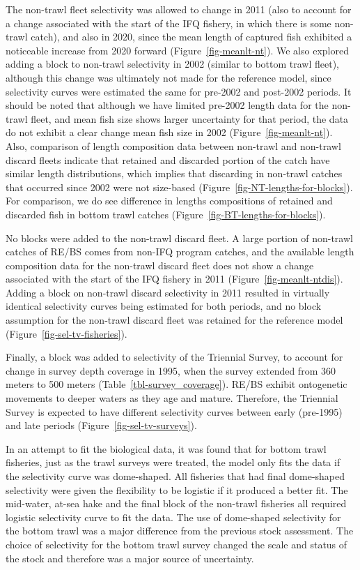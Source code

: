 \documentclass[
]{scrartcl}
\begin{document}
The non-trawl fleet selectivity was allowed to change in 2011 (also to
account for a change associated with the start of the IFQ fishery, in
which there is some non-trawl catch), and also in 2020, since the mean
length of captured fish exhibited a noticeable increase from 2020
forward (Figure~\ref{fig-meanlt-nt}). We also explored adding a block to
non-trawl selectivity in 2002 (similar to bottom trawl fleet), although
this change was ultimately not made for the reference model, since
selectivity curves were estimated the same for pre-2002 and post-2002
periods. It should be noted that although we have limited pre-2002
length data for the non-trawl fleet, and mean fish size shows larger
uncertainty for that period, the data do not exhibit a clear change mean
fish size in 2002 (Figure~\ref{fig-meanlt-nt}). Also, comparison of
length composition data between non-trawl and non-trawl discard fleets
indicate that retained and discarded portion of the catch have similar
length distributions, which implies that discarding in non-trawl catches
that occurred since 2002 were not size-based
(Figure~\ref{fig-NT-lengths-for-blocks}). For comparison, we do see
difference in lengths compositions of retained and discarded fish in
bottom trawl catches (Figure~\ref{fig-BT-lengths-for-blocks}).

No blocks were added to the non-trawl discard fleet. A large portion of
non-trawl catches of RE/BS comes from non-IFQ program catches, and the
available length composition data for the non-trawl discard fleet does
not show a change associated with the start of the IFQ fishery in 2011
(Figure~\ref{fig-meanlt-ntdis}). Adding a block on non-trawl discard
selectivity in 2011 resulted in virtually identical selectivity curves
being estimated for both periods, and no block assumption for the
non-trawl discard fleet was retained for the reference model
(Figure~\ref{fig-sel-tv-fisheries}).

Finally, a block was added to selectivity of the Triennial Survey, to
account for change in survey depth coverage in 1995, when the survey
extended from 360 meters to 500 meters
(Table~\ref{tbl-survey_coverage}). RE/BS exhibit ontogenetic movements
to deeper waters as they age and mature. Therefore, the Triennial Survey
is expected to have different selectivity curves between early
(pre-1995) and late periods (Figure~\ref{fig-sel-tv-surveys}).

In an attempt to fit the biological data, it was found that for bottom
trawl fisheries, just as the trawl surveys were treated, the model only
fits the data if the selectivity curve was dome-shaped. All fisheries
that had final dome-shaped selectivity were given the flexibility to be
logistic if it produced a better fit. The mid-water, at-sea hake and the
final block of the non-trawl fisheries all required logistic selectivity
curve to fit the data. The use of dome-shaped selectivity for the bottom
trawl was a major difference from the previous stock assessment. The
choice of selectivity for the bottom trawl survey changed the scale and
status of the stock and therefore was a major source of uncertainty.
\end{document}
